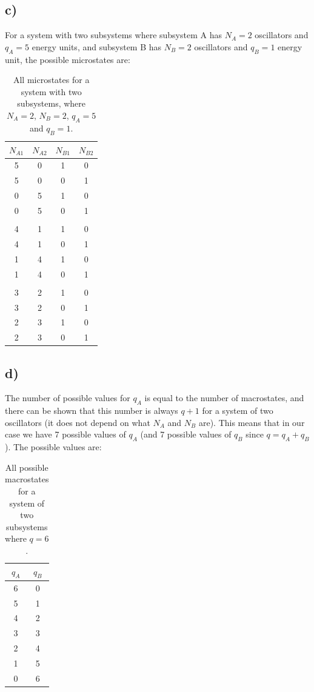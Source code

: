 \documentclass{scrartcl}
\begin{document}
\subsection*{c)}
For a system with two subsystems where subsystem A has $N_A=2$ oscillators and $q_A=5$ energy units, and subsystem B has $N_B=2$ oscillators and $q_B=1$ energy unit, the possible microstates are:
\begin{table}[!htbp]
 \centering
 \begin{tabular}{cccc}
   \toprule
   $N_{A1}$ & $N_{A2}$ & $N_{B1}$ & $N_{B2}$\\
   \midrule
   5 & 0 & 1 & 0\\
   5 & 0 & 0 & 1\\
   0 & 5 & 1 & 0\\
   0 & 5 & 0 & 1\\
     &   &   &  \\
   4 & 1 & 1 & 0\\
   4 & 1 & 0 & 1\\
   1 & 4 & 1 & 0\\
   1 & 4 & 0 & 1\\
     &   &   &  \\
   3 & 2 & 1 & 0\\
   3 & 2 & 0 & 1\\
   2 & 3 & 1 & 0\\
   2 & 3 & 0 & 1\\
   \bottomrule
 \end{tabular}
 \caption{All microstates for a system with two subsystems, where $N_A=2$, $N_B=2$, $q_A=5$ and $q_B=1$.}
 \label{tab:table2}
\end{table}

\subsection*{d)}
The number of possible values for $q_A$ is equal to the number of macrostates, and there can be shown that this number is always $q+1$ for a system of two oscillators (it does not depend on what $N_A$ and $N_B$ are). This means that in our case we have 7 possible values of $q_A$ (and 7 possible values of $q_B$ since $q = q_A + q_B$). The possible values are:
\begin{table}[!htbp]
 \centering
 \begin{tabular}{cc}
   \toprule
   $q_A$ & $q_B$\\
   \midrule
   6 & 0\\
   5 & 1\\
   4 & 2\\
   3 & 3\\
   2 & 4\\
   1 & 5\\
   0 & 6\\
   \bottomrule
 \end{tabular}
 \caption{All possible macrostates for a system of two subsystems where $q=6$.}
 \label{tab:table3}
\end{table}
\newpage
\end{document}
